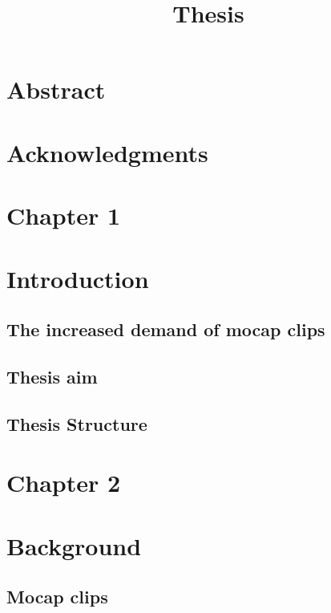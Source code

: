 \documentclass[12pt,oneside,a4paper,english]{article}
\title{Thesis} %
\begin{document}


\newpage
\doublespacing
\renewcommand{\baselinestretch}{1}\normalsize
\tableofcontents
\renewcommand{\baselinestretch}{1}\normalsize
\singlespacing
\thispagestyle{fancy} %
\newpage
{} 
\newpage
\addtocounter{section}{-1}
\section{Abstract}
\addtocounter{section}{-1}
\newpage
\section{Acknowledgments}
\newpage
\section*{Chapter 1 \\}
\section{Introduction}
\subsection{The increased demand of mocap clips}
 
\subsection{Thesis aim}
 
\subsection{Thesis Structure}
 

\newpage
\section*{Chapter 2 \\}
\section{Background}
\subsection{Mocap clips}
 
\pagebreak
\end{document}

